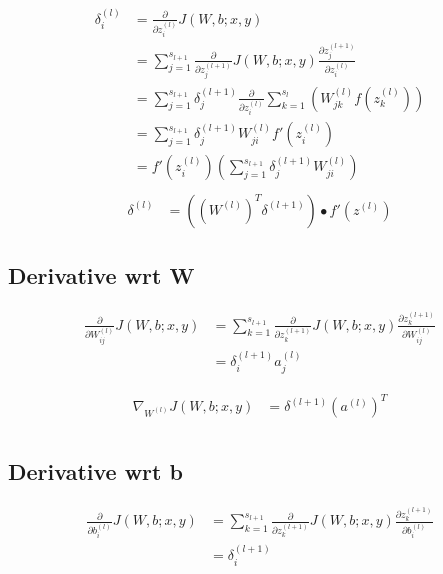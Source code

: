 \documentclass{article}
\begin{document}
	\begin{equation}
		\begin{aligned}
			\delta_i^{(l)} &= \frac{\partial}{\partial z_i^{(l)}} J(W, b; x, y) \\	
			&= \sum_{j=1}^{s_{l+1}} \frac{\partial}{\partial z_j^{(l+1)}} J(W, b; x, y) \frac{\partial z_j^{(l+1)}}{\partial z_i^{(l)}} \\
			&= \sum_{j=1}^{s_{l+1}} \delta_j^{(l+1)} 
			\frac{\partial}{\partial z_i^{(l)}} \sum_{k=1}^{s_{l}}(W_{jk}^{(l)}f(z_k^{(l)})) \\
			&= \sum_{j=1}^{s_{l+1}} \delta_j^{(l+1)} W_{ji}^{(l)} f'(z_i^{(l)}) \\
			&= f'(z_i^{(l)})(\sum_{j=1}^{s_{l+1}} \delta_j^{(l+1)} W_{ji}^{(l)}) \\
		\end{aligned}
	\end{equation}
	\begin{equation}
		\begin{aligned}
			\delta^{(l)} &= ((W^{(l)})^T \delta^{(l+1)}) \bullet f'(z^{(l)}) 
		\end{aligned}
	\end{equation}
	\subsection{Derivative wrt W}
	\begin{equation}
		\begin{aligned}
			\frac{\partial}{\partial W_{ij}^{(l)}} J(W, b; x, y) &= \sum_{k=1}^{s_{l+1}} \frac{\partial}{\partial z_k^{(l+1)}}J(W, b; x, y) \frac{\partial z_k^{(l+1)}}{\partial  W_{ij}^{(l)}} \\
			&= \delta_i^{(l+1)} a_j^{(l)}
		\end{aligned}
	\end{equation}
	
	\begin{equation}
		\begin{aligned}
			\nabla_{W^{(l)}} J(W, b; x, y) &= \delta^{(l+1)}(a^{(l)})^T \\
		\end{aligned}
	\end{equation}
	\subsection{Derivative wrt b}
	\begin{equation}
		\begin{aligned}
			\frac{\partial}{\partial b_{i}^{(l)}} J(W, b; x, y) &=  \sum_{k=1}^{s_{l+1}} \frac{\partial}{\partial z_k^{(l+1)}}J(W, b; x, y) \frac{\partial z_k^{(l+1)}}{\partial  b_{i}^{(l)}} \\
			&= \delta_i^{(l+1)} 
		\end{aligned}
	\end{equation}
		
\end{document}

